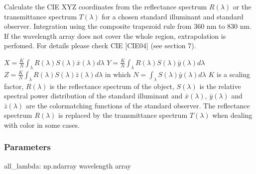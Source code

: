 \documentclass[letterpaper,10pt,english]{sphinxmanual}
\begin{document}
\begin{fulllineitems}
\label{\detokenize{07_colors:skinoptics.colors.XYZ_from_spectrum}}
\pysigstartsignatures
{}
\pysigstopsignatures
\sphinxAtStartPar
Calculate the CIE XYZ coordinates from the reflectance spectrum \(R(\lambda)\) or the
transmittance spectrum \(T(\lambda)\) for a chosen standard illuminant and standard observer.
Integration using the composite trapezoid rule from 360 nm to 830 nm.
If the wavelength array does not cover the whole region, extrapolation is perfomed.
For details please check CIE {[}CIE04{]} (see section 7).

\sphinxAtStartPar
\(X = \frac{K}{N} \int_\lambda R(\lambda) S(\lambda) \bar{x}(\lambda) d\lambda\)
\(Y = \frac{K}{N}\int_\lambda R(\lambda) S(\lambda) \bar{y}(\lambda) d\lambda\)
\(Z = \frac{K}{N}\int_\lambda R(\lambda) S(\lambda) \bar{z}(\lambda) d\lambda\)
in which 
\(N = \int_\lambda S(\lambda) \bar{y}(\lambda) d\lambda\)
\(K\) is a scaling factor, \(R(\lambda)\) is the reflectance spectrum of the object,
\(S(\lambda)\) is the relative spectral power distribution of the standard illuminant
and \(\bar{x}(\lambda)\), \(\bar{y}(\lambda)\) and \(\bar{z}(\lambda)\) are the
color\sphinxhyphen{}matching functions of the standard observer.
The reflectance spectrum \(R(\lambda)\) is replaced by the transmittance spectrum
\(T(\lambda)\) when dealing with color in some cases.


\subsubsection{Parameters}
\label{\detokenize{07_colors:id20}}
\sphinxAtStartPar
all\_lambda: np.ndarray
wavelength array


\end{fulllineitems}
\end{document}
